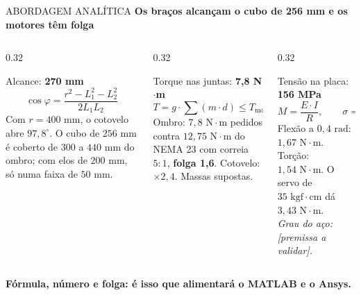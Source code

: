 \documentclass[aspectratio=169, 10pt]{beamer}
\newcommand{\currentpresenter}{Rodrigo}
\newcommand{\setpresenter}[1]{\renewcommand{\currentpresenter}{#1}}
\begin{document}
	\setpresenter{Gabriel}
	\begin{frame}{ABORDAGEM ANALÍTICA}
		\textbf{\normalsize Os braços alcançam o cubo de 256 mm e os motores têm folga}
		\vspace{0.18cm}
		
		\begin{columns}[T]
			\begin{column}{0.32\textwidth}
				\begin{block}{Alcance: \textbf{270 mm}}
					\scriptsize
					$$\cos \varphi = \frac{r^{2} - L_{1}^{2} - L_{2}^{2}}{2 L_{1} L_{2}}$$
					Com $r = 400\text{ mm}$, o cotovelo abre $97,8^{\circ}$. O cubo de $256\text{ mm}$ é coberto de $300$ a $440\text{ mm}$ do ombro; com elos de $200\text{ mm}$, só numa faixa de $50\text{ mm}$.
				\end{block}
			\end{column}
			
			\begin{column}{0.32\textwidth}
				\begin{block}{Torque nas juntas: \textbf{7,8 N$\cdot$m}}
					\scriptsize
					$$T = g \cdot \sum(m \cdot d) \le T_{\text{motor}} \cdot i \cdot \eta$$
					Ombro: $7,8\text{ N}\cdot\text{m}$ pedidos contra $12,75\text{ N}\cdot\text{m}$ do NEMA 23 com correia $5{:}1$, \textbf{folga 1,6}. Cotovelo: $\times 2,4$. Massas supostas.
				\end{block}
			\end{column}
			
			\begin{column}{0.32\textwidth}
				\begin{block}{Tensão na placa: \textbf{156 MPa}}
					\scriptsize
					$$M = \frac{E \cdot I}{R}, \qquad \sigma = \frac{M \cdot c}{I}$$
					Flexão a $0,4\text{ rad}$: $1,67\text{ N}\cdot\text{m}$. Torção: $1,54\text{ N}\cdot\text{m}$. O servo de $35\text{ kgf}\cdot\text{cm}$ dá $3,43\text{ N}\cdot\text{m}$.\\
					\textit{Grau do aço: [premissa a validar].}
				\end{block}
			\end{column}
		\end{columns}
		
		\vspace{0.3cm}
		\centering
		\textbf{\color{FlexoBlue}Fórmula, número e folga: é isso que alimentará o MATLAB e o Ansys.}
	\end{frame}
	
\end{document}
